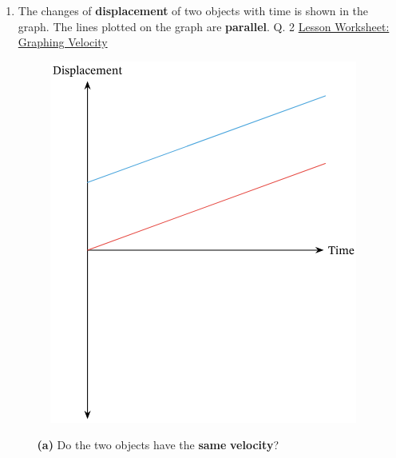 \documentclass[A4,12pt]{article}
\begin{document}
\begin{enumerate}[label=\bfseries (\arabic*)]
\begin{itemize}
\end{itemize}











\item The changes of \textbf{displacement} of two objects with time is shown in the graph. The lines plotted on the graph are \textbf{parallel}. \cite{Nagwa} Q. 2 \href{https://www.nagwa.com/en/worksheets/715142164735/}{Lesson Worksheet: Graphing Velocity}
%
\begin{figure}[H]
    \centering
    \includegraphics[scale=0.7]{Nagwa_Q2_disp.png}
\end{figure}
%
\begin{itemize}
    \item[\bf (a)] Do the two objects have the \textbf{same} \textbf{velocity}?
    

\end{itemize}
\end{enumerate}
\end{document}
